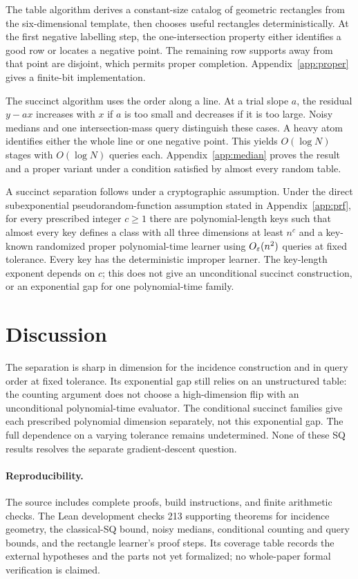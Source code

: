 The table algorithm derives a constant-size catalog of geometric rectangles from the six-dimensional template, then chooses useful rectangles deterministically. At the first negative labelling step, the one-intersection property either identifies a good row or locates a negative point. The remaining row supports away from that point are disjoint, which permits proper completion. Appendix~\ref{app:proper} gives a finite-bit implementation.

The succinct algorithm uses the order along a line. At a trial slope $a$, the residual $y-ax$ increases with $x$ if $a$ is too small and decreases if it is too large. Noisy medians and one intersection-mass query distinguish these cases. A heavy atom identifies either the whole line or one negative point. This yields $O(\log N)$ stages with $O(\log N)$ queries each. Appendix~\ref{app:median} proves the result and a proper variant under a condition satisfied by almost every random table.

A succinct separation follows under a cryptographic assumption. Under the direct subexponential pseudorandom-function assumption stated in Appendix~\ref{app:prf}, for every prescribed integer $c\ge1$ there are polynomial-length keys such that almost every key defines a class with all three dimensions at least $n^c$ and a key-known randomized proper polynomial-time learner using $O_\varepsilon(n^2)$ queries at fixed tolerance. Every key has the deterministic improper learner. The key-length exponent depends on $c$; this does not give an unconditional succinct construction, or an exponential gap for one polynomial-time family.

\section{Discussion}\label{sec:open}
The separation is sharp in dimension for the incidence construction and in query order at fixed tolerance. Its exponential gap still relies on an unstructured table: the counting argument does not choose a high-dimension flip with an unconditional polynomial-time evaluator. The conditional succinct families give each prescribed polynomial dimension separately, not this exponential gap. The full dependence on a varying tolerance remains undetermined. None of these SQ results resolves the separate gradient-descent question.

\ifreview\else
{}
\fi
\paragraph{Reproducibility.}
The source includes complete proofs, build instructions, and finite arithmetic checks. The Lean development checks 213 supporting theorems for incidence geometry, the classical-SQ bound, noisy medians, conditional counting and query bounds, and the rectangle learner's proof steps. Its coverage table records the external hypotheses and the parts not yet formalized; no whole-paper formal verification is claimed.
\label{main-end}
